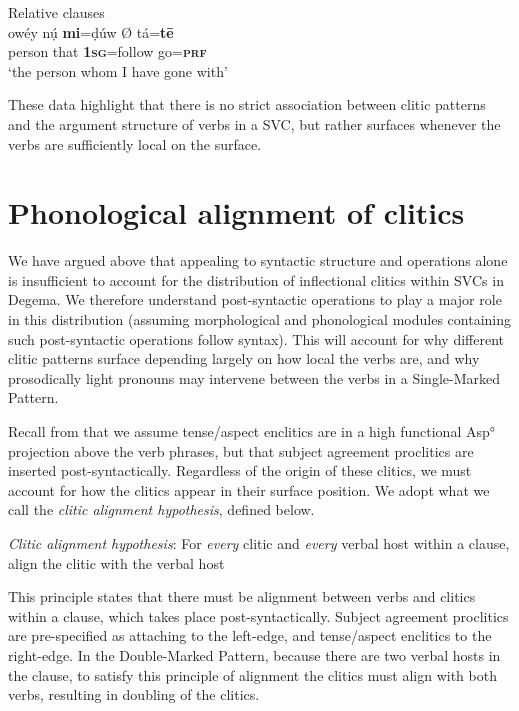\documentclass[output=paper]{langsci/langscibook}
\begin{document}
\ea\label{ex:rolle:46}
{Relative clauses} \\
\gll  owéy     nụ́     \textbf{mi}=ḍúw Ø tá=\textbf{tē}\\
     person    that    \textbf{\textsc{1sg}}=follow  { }  go=\textbf{\textsc{prf}}\\
\glt ‘the person whom I have gone with’
\z

These data highlight that there is no strict association between clitic patterns and the argument structure of verbs in a SVC, but rather surfaces whenever the verbs are sufficiently local on the surface. 

\section{Phonological alignment of clitics} 

We have argued above that appealing to syntactic structure and operations alone is insufficient to account for the distribution of inflectional clitics within SVCs in Degema. We therefore understand post-syntactic operations to play a major role in this distribution (assuming morphological and phonological modules containing such post-syntactic operations follow syntax). This will account for why different clitic patterns surface depending largely on how local the verbs are, and why prosodically light pronouns may intervene between the verbs in a Single-Marked Pattern. 

Recall from  that we assume tense/aspect enclitics are in a high functional Asp° projection above the verb phrases, but that subject agreement proclitics are inserted post-syntactically. Regardless of the origin of these clitics, we must account for how the clitics appear in their surface position. We adopt what we call the \textit{clitic alignment hypothesis}, defined below. 


\ea\label{ex:rolle:47}
{\textit{Clitic alignment hypothesis}: For \textit{every} clitic and \textit{every} verbal host within a clause, align the clitic with the verbal host}
\z

This principle states that there must be alignment between verbs and clitics within a clause, which takes place post-syntactically. Subject agreement proclitics are pre-specified as attaching to the left-edge, and tense/aspect enclitics to the right-edge. In the Double-Marked Pattern, because there are two verbal hosts in the clause, to satisfy this principle of alignment the clitics must align with both verbs, resulting in doubling of the clitics. 
\end{document}
